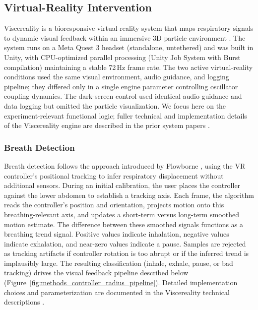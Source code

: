 \documentclass[pdflatex,sn-basic,lineno]{sn-jnl}
\begin{document}
\subsection{Virtual-Reality Intervention}\label{subsec:vr_intervention}
Viscereality is a bioresponsive virtual-reality system that maps respiratory signals to dynamic visual feedback within an immersive 3D particle environment \citep{fejer2025viscereality,fejer2026breathing}. The system runs on a Meta Quest 3 headset (standalone, untethered) and was built in Unity, with CPU-optimized parallel processing (Unity Job System with Burst compilation) maintaining a stable 72\,Hz frame rate. The two active virtual-reality conditions used the same visual environment, audio guidance, and logging pipeline; they differed only in a single engine parameter controlling oscillator coupling dynamics. The dark-screen control used identical audio guidance and data logging but omitted the particle visualization. We focus here on the experiment-relevant functional logic; fuller technical and implementation details of the Viscereality engine are described in the prior system papers \citep{fejer2025viscereality,fejer2026breathing}.

\subsubsection{Breath Detection}\label{subsubsec:breath_detection}
Breath detection follows the approach introduced by Flowborne \citep{rockstroh2021mobile}, using the VR controller's positional tracking to infer respiratory displacement without additional sensors. During an initial calibration, the user places the controller against the lower abdomen to establish a tracking axis. Each frame, the algorithm reads the controller's position and orientation, projects motion onto this breathing-relevant axis, and updates a short-term versus long-term smoothed motion estimate. The difference between these smoothed signals functions as a breathing trend signal. Positive values indicate inhalation, negative values indicate exhalation, and near-zero values indicate a pause. Samples are rejected as tracking artifacts if controller rotation is too abrupt or if the inferred trend is implausibly large. The resulting classification (inhale, exhale, pause, or bad tracking) drives the visual feedback pipeline described below (Figure~\ref{fig:methods_controller_radius_pipeline}). Detailed implementation choices and parameterization are documented in the Viscereality technical descriptions \citep{fejer2025viscereality,fejer2026breathing}.
\end{document}
